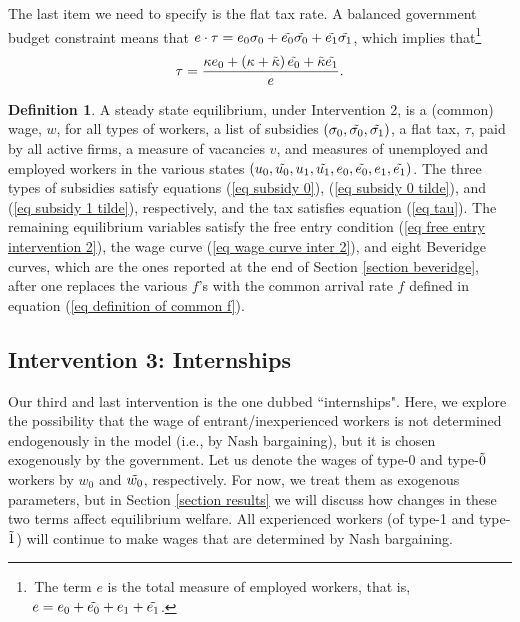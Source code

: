 \documentclass[12pt]{article} %
\theoremstyle{definition}
\newtheorem{definition}{Definition}%
\begin{document}
The last item we need to specify is the flat tax rate.  %
A balanced government budget constraint means that $e \cdot \tau = e_0 \sigma_0 + \Tilde{e_0}\Tilde{\sigma_0} + \Tilde{e_1}\Tilde{\sigma_1}$, which implies that\footnote{\,The term $e$ is the total measure of employed workers, that is, $e= e_0+ \Tilde{e_0}+e_1+\tilde{e_1}$.} 
\begin{equation}
    \tau = \frac{\kappa e_0 + (\kappa + \Tilde{\kappa})\, \Tilde{e_0} + \Tilde{\kappa}\Tilde{e_1}}{e}. \label{eq tau}
\end{equation}



\medskip 

\begin{definition}\label{definition equil inter 2}
    A steady state equilibrium, under Intervention 2, is a (common) wage, $w$, for all types of workers, a list of subsidies $(\sigma_0, \Tilde{\sigma_0}, \Tilde{\sigma_1})$, a flat tax, $\tau$, paid by all active firms, a measure of vacancies $v$, and measures of unemployed and employed workers in the various states $(u_0, \Tilde{u_0}, u_1, \Tilde{u_1}, e_0, \Tilde{e_0}, e_1, \Tilde{e_1})$. The three types of subsidies satisfy equations (\ref{eq subsidy 0}), (\ref{eq subsidy 0 tilde}), and (\ref{eq subsidy 1 tilde}), respectively, and the tax satisfies equation (\ref{eq tau}). The remaining equilibrium variables satisfy the free entry condition (\ref{eq free entry intervention 2}), the wage curve (\ref{eq wage curve inter 2}), and eight Beveridge curves, which are the ones reported at the end of Section \ref{section beveridge}, after one replaces the various $f$'s with the common arrival rate $f$ defined in equation (\ref{eq definition of common f}). 
    \end{definition} 


\subsection{Intervention 3: Internships} \label{section internships}

Our third and last intervention is the one dubbed ``internships". Here, we explore the possibility that the wage of entrant/inexperienced workers is not determined endogenously in the model (i.e., by Nash bargaining), but it is chosen exogenously by the government. Let us denote the wages of type-0 and type-$\Tilde{0}$ workers by $w_0$ and $\Tilde{w_0}$, respectively. For now, we treat them as exogenous parameters, but in Section \ref{section results} we will discuss how changes in these two terms affect equilibrium welfare. All experienced workers (of type-1 and type-$\Tilde{1}$) will continue to make wages that are determined by Nash bargaining. 
\end{document}

